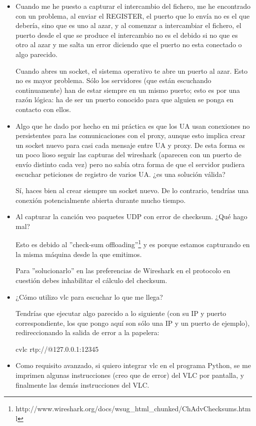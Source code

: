 \documentclass[a4paper,11pt]{article}
\begin{document}
\begin{itemize}
\item Cuando me he puesto a capturar el intercambio del fichero, me he encontrado con un problema, al enviar el REGISTER, el puerto que lo envía no es el que debería, sino que es uno al azar, y al comenzar a intercambiar el fichero, el puerto desde el que se produce el intercambio no es el debido si no que es otro al azar y me salta un error diciendo que el puerto no esta conectado o algo parecido.

Cuando abres un socket, el sistema operativo te abre un puerto al azar. Esto no es mayor problema. Sólo los servidores (que están escuchando continuamente) han de estar siempre en un mismo puerto; esto es por una razón lógica: ha de ser un puerto conocido para que alguien se ponga en contacto con ellos.

\item Algo que he dado por hecho en mi práctica es que los UA usan conexiones no persistentes para las comunicaciones con el proxy, aunque esto implica crear un socket nuevo para casi cada mensaje entre UA y proxy. De esta forma es un poco lioso seguir las capturas del wireshark (aparecen con un puerto de envío distinto cada vez) pero no sabía otra forma de que el servidor pudiera escuchar peticiones de registro de varios UA. ¿es una solución válida?

Sí, haces bien al crear siempre un socket nuevo. De lo contrario, tendrías una conexión potencialmente abierta durante mucho tiempo.

\item Al capturar la canción veo paquetes UDP con error de checksum. ¿Qué hago mal?

Esto es debido al ''check-sum offloading''\footnote{http://www.wireshark.org/docs/wsug\_html\_chunked/ChAdvChecksums.html} y es porque estamos capturando en la misma máquina desde la que emitimos.

Para ''solucionarlo'' en las preferencias de Wireshark en el protocolo en cuestión debes inhabilitar el cálculo del checksum.

\item ¿Cómo utilizo vlc para escuchar lo que me llega?

Tendrías que ejecutar algo parecido a lo siguiente (con su IP y puerto correspondiente, los que pongo aquí son sólo una IP y un puerto de ejemplo), redireccionando la salida de error a la papelera:

cvlc rtp://@127.0.0.1:12345 

\item Como requisito avanzado, si quiero integrar vlc en el programa Python, se me imprimen algunas instrucciones (creo que de error) del VLC por pantalla, y finalmente las demás instrucciones del VLC.


\end{itemize}
\end{document}
